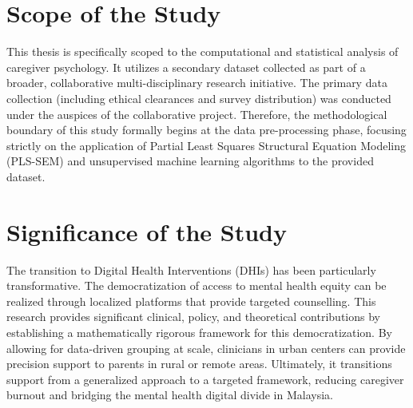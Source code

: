 \section{Scope of the Study}
This thesis is specifically scoped to the computational and statistical analysis of caregiver psychology. It utilizes a secondary dataset collected as part of a broader, collaborative multi-disciplinary research initiative. The primary data collection (including ethical clearances and survey distribution) was conducted under the auspices of the collaborative project. Therefore, the methodological boundary of this study formally begins at the data pre-processing phase, focusing strictly on the application of Partial Least Squares Structural Equation Modeling (PLS-SEM) and unsupervised machine learning algorithms to the provided dataset.

\section{Significance of the Study}
The transition to Digital Health Interventions (DHIs) has been particularly transformative. The democratization of access to mental health equity can be realized through localized platforms that provide targeted counselling. This research provides significant clinical, policy, and theoretical contributions by establishing a mathematically rigorous framework for this democratization. By allowing for data-driven grouping at scale, clinicians in urban centers can provide precision support to parents in rural or remote areas. Ultimately, it transitions support from a generalized approach to a targeted framework, reducing caregiver burnout and bridging the mental health digital divide in Malaysia.
